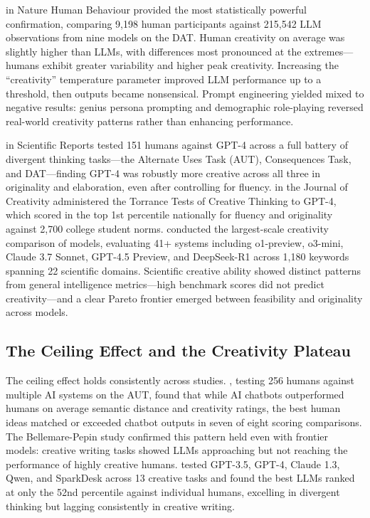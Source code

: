 \documentclass[12pt,a4paper]{article}
\begin{document}
\citet{wang2025} in Nature Human Behaviour provided the most statistically powerful confirmation, comparing 9,198 human participants against 215,542 LLM observations from nine models on the DAT. Human creativity on average was slightly higher than LLMs, with differences most pronounced at the extremes---humans exhibit greater variability and higher peak creativity. Increasing the ``creativity'' temperature parameter improved LLM performance up to a threshold, then outputs became nonsensical. Prompt engineering yielded mixed to negative results: genius persona prompting and demographic role-playing reversed real-world creativity patterns rather than enhancing performance.

\citet{hubert2024} in Scientific Reports tested 151 humans against GPT-4 across a full battery of divergent thinking tasks---the Alternate Uses Task (AUT), Consequences Task, and DAT---finding GPT-4 was robustly more creative across all three in originality and elaboration, even after controlling for fluency. \citet{guzik2023} in the Journal of Creativity administered the Torrance Tests of Creative Thinking to GPT-4, which scored in the top 1st percentile nationally for fluency and originality against 2,700 college student norms. \citet{ruan2025} conducted the largest-scale creativity comparison of models, evaluating 41+ systems including o1-preview, o3-mini, Claude 3.7 Sonnet, GPT-4.5 Preview, and DeepSeek-R1 across 1,180 keywords spanning 22 scientific domains. Scientific creative ability showed distinct patterns from general intelligence metrics---high benchmark scores did not predict creativity---and a clear Pareto frontier emerged between feasibility and originality across models.

\subsection{The Ceiling Effect and the Creativity Plateau}
The ceiling effect holds consistently across studies. \citet{koivisto2023}, testing 256 humans against multiple AI systems on the AUT, found that while AI chatbots outperformed humans on average semantic distance and creativity ratings, the best human ideas matched or exceeded chatbot outputs in seven of eight scoring comparisons. The Bellemare-Pepin study confirmed this pattern held even with frontier models: creative writing tasks showed LLMs approaching but not reaching the performance of highly creative humans. \citet{rosenbaum2025} tested GPT-3.5, GPT-4, Claude 1.3, Qwen, and SparkDesk across 13 creative tasks and found the best LLMs ranked at only the 52nd percentile against individual humans, excelling in divergent thinking but lagging consistently in creative writing.
\end{document}
